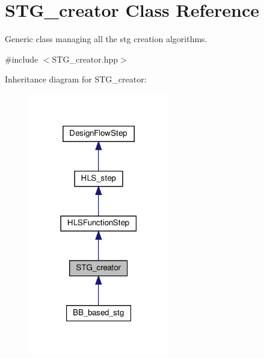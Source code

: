 \hypertarget{classSTG__creator}{}\section{S\+T\+G\+\_\+creator Class Reference}
\label{classSTG__creator}


Generic class managing all the stg creation algorithms.  




{\ttfamily \#include $<$S\+T\+G\+\_\+creator.\+hpp$>$}



Inheritance diagram for S\+T\+G\+\_\+creator\+:
\nopagebreak
\begin{figure}[H]
\begin{center}
\leavevmode
\includegraphics[width=174pt]{d1/ddf/classSTG__creator__inherit__graph}
\end{center}
\end{figure}


